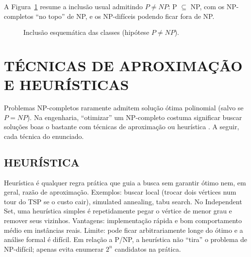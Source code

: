 \documentclass[
    12pt,
    oneside,
    a4paper,
    chapter=TITLE,
    section=TITLE,
    sumario=abnt-6027-2012
]{abntex2}
\begin{document}
A Figura~\ref{fig:inclusao} resume a inclusão usual admitindo $P \neq NP$: P $\subseteq$ NP, com os NP-completos ``no topo'' de NP, e os NP-difíceis podendo ficar fora de NP.

\begin{figure}[!h]
    \centering
    \caption{Inclusão esquemática das classes (hipótese $P \neq NP$).}
    \label{fig:inclusao}
\end{figure}

\chapter{TÉCNICAS DE APROXIMAÇÃO E HEURÍSTICAS}
\label{cap:tecnicas}

Problemas NP-completos raramente admitem solução ótima polinomial (salvo se $P=NP$). Na engenharia, ``otimizar'' um NP-completo costuma significar buscar soluções boas o bastante com técnicas de aproximação ou heurística \cite{cormen,garey}. A seguir, cada técnica do enunciado.

\section{HEURÍSTICA}
\label{sec:heuristica}

Heurística é qualquer regra prática que guia a busca sem garantir ótimo nem, em geral, razão de aproximação. Exemplos: buscar local (trocar dois vértices num tour do TSP se o custo cair), simulated annealing, tabu search. No Independent Set, uma heurística simples é repetidamente pegar o vértice de menor grau e remover seus vizinhos. Vantagens: implementação rápida e bom comportamento médio em instâncias reais. Limite: pode ficar arbitrariamente longe do ótimo e a análise formal é difícil. Em relação a P/NP, a heurística não ``tira'' o problema de NP-difícil; apenas evita enumerar $2^n$ candidatos na prática.
\end{document}
